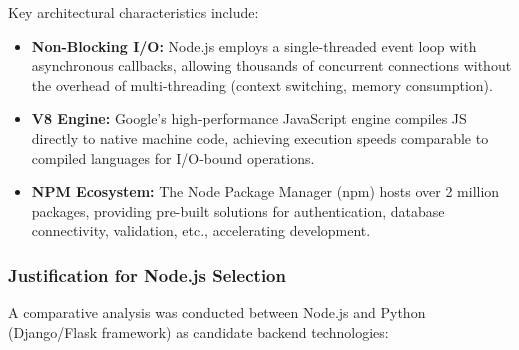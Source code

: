 \documentclass[12pt, a4paper]{report}
\begin{document}
Key architectural characteristics include:

\begin{itemize}
    \item \textbf{Non-Blocking I/O:} Node.js employs a single-threaded event loop with asynchronous callbacks, allowing thousands of concurrent connections without the overhead of multi-threading (context switching, memory consumption).
    
    \item \textbf{V8 Engine:} Google's high-performance JavaScript engine compiles JS directly to native machine code, achieving execution speeds comparable to compiled languages for I/O-bound operations.
    
    \item \textbf{NPM Ecosystem:} The Node Package Manager (npm) hosts over 2 million packages, providing pre-built solutions for authentication, database connectivity, validation, etc., accelerating development.
\end{itemize}

\subsubsection{Justification for Node.js Selection}

A comparative analysis was conducted between Node.js and Python (Django/Flask framework) as candidate backend technologies:
\end{document}
